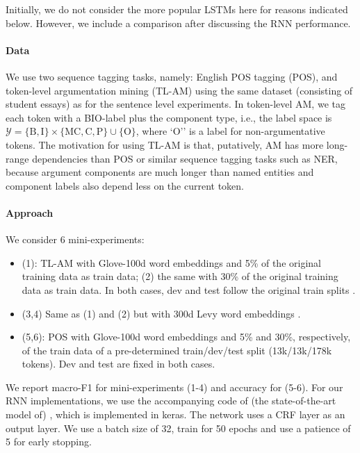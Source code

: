 Initially, we do not consider the more popular LSTMs here for reasons indicated below. However, we include a comparison after discussing the RNN performance. 

\paragraph{Data}
We use two sequence tagging tasks, namely: English POS tagging (POS), and token-level argumentation mining (TL-AM) using the same dataset (consisting of student essays) as for the sentence level experiments. In token-level AM, we tag each token with a BIO-label plus the component type, i.e., the label space is $\mathcal{Y}=\{\text{B},\text{I}\}\times\{\text{MC},\text{C},\text{P}\}\cup\{\text{O}\}$, where 
`O'' is a label for non-argumentative tokens. The motivation for using TL-AM is that, putatively, AM has more long-range dependencies than POS or similar sequence tagging tasks such as NER, because argument components are much longer than named entities and component labels also %
depend less %
on the current token.  

\paragraph{Approach} We consider 6 mini-experiments: 
\begin{itemize}[noitemsep,leftmargin=0.6cm]
  \item (1): TL-AM with Glove-100d word embeddings and 5\% of the original training data as train data; (2) the same with 30\% of the original training data as train data. In both cases, dev and test follow the original train splits \cite{Eger:2017}. 
  \item (3,4) Same as (1) and (2) but with 300d Levy word embeddings \cite{Levy:2014}.
  \item (5,6): POS with Glove-100d word embeddings and 5\% and 30\%, respectively, of the train data of a pre-determined train/dev/test split (13k/13k/178k tokens). Dev and test are fixed in both cases.    
\end{itemize}
We report macro-F1 for mini-experiments (1-4) and accuracy for (5-6). For our RNN implementations, we use the accompanying code of (the state-of-the-art model of) \citet{Reimers:2017}, which is implemented in keras. The network uses a CRF layer as an output layer. We use a batch size of 32, train for 50 epochs and use a patience of 5 for early stopping.
